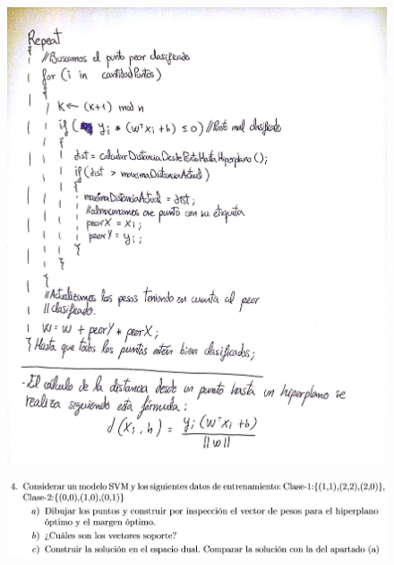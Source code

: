 \begin{figure}[H]
	\includegraphics[scale=0.30]{imagenes/ej3} 
\end{figure}

\newpage

\begin{figure}[H]
	\includegraphics[scale=0.65]{imagenes/4} 
\end{figure}


